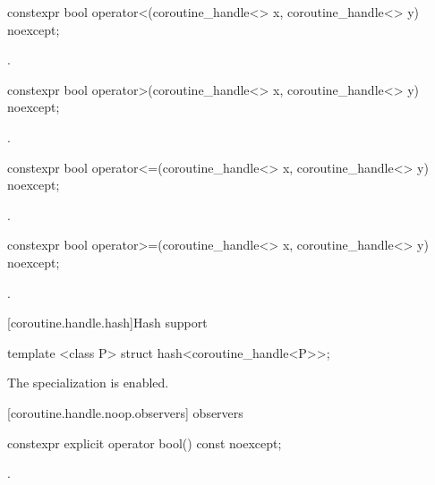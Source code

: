 \begin{itemdecl}
constexpr bool operator<(coroutine_handle<> x, coroutine_handle<> y) noexcept;
\end{itemdecl}

\begin{itemdescr}
\pnum \returns {}.
\end{itemdescr}

\begin{itemdecl}
constexpr bool operator>(coroutine_handle<> x, coroutine_handle<> y) noexcept;
\end{itemdecl}

\begin{itemdescr}
\pnum \returns {}.
\end{itemdescr}

\begin{itemdecl}
constexpr bool operator<=(coroutine_handle<> x, coroutine_handle<> y) noexcept;
\end{itemdecl}

\begin{itemdescr}
\pnum \returns {}.
\end{itemdescr}

\begin{itemdecl}
constexpr bool operator>=(coroutine_handle<> x, coroutine_handle<> y) noexcept;
\end{itemdecl}

\begin{itemdescr}
\pnum \returns {}.
\end{itemdescr}

[coroutine.handle.hash]{Hash support}

\begin{itemdecl}
template <class P> struct hash<coroutine_handle<P>>;
\end{itemdecl}

\begin{itemdescr}
\pnum The specialization is enabled.
\end{itemdescr}

[coroutine.handle.noop.observers]{ observers}

\begin{itemdecl}
constexpr explicit operator bool() const noexcept; 
\end{itemdecl}

\begin{itemdescr}
\pnum \returns {}.
\end{itemdescr}

